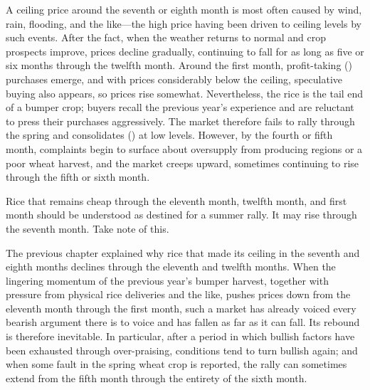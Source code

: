 \commentary
A ceiling price around the seventh or eighth month is most often
caused by wind, rain, flooding, and the like---the high price
having been driven to ceiling levels by such events. After the
fact, when the weather returns to normal and crop prospects improve,
prices decline gradually, continuing to fall for as long as five or
six months through the twelfth month. Around the first month,
profit-taking () purchases emerge, and with prices
considerably below the ceiling, speculative buying also appears, so
prices rise somewhat. Nevertheless, the rice is the tail end of a
bumper crop; buyers recall the previous year's experience and are
reluctant to press their purchases aggressively. The market
therefore fails to rally through the spring and consolidates
() at low levels. However, by the fourth or fifth
month, complaints begin to surface about oversupply from producing
regions or a poor wheat harvest, and the market creeps upward,
sometimes continuing to rise through the fifth or sixth month.


\begin{sokyubox}
{\small\itshape\color{sokyubar} }

\medskip
Rice that remains cheap through the eleventh month, twelfth month,
and first month should be understood as destined for a summer rally.
It may rise through the seventh month. Take note of this.
\end{sokyubox}

\commentary
The previous chapter explained why rice that made its ceiling in
the seventh and eighth months declines through the eleventh and
twelfth months. When the lingering momentum of the previous year's
bumper harvest, together with pressure from physical rice
deliveries and the like, pushes prices down from the eleventh month
through the first month, such a market has already voiced every
bearish argument there is to voice and has fallen as far as it can
fall. Its rebound is therefore inevitable. In particular, after a
period in which bullish factors have been exhausted through
over-praising, conditions tend to turn bullish again; and when some
fault in the spring wheat crop is reported, the rally can
sometimes extend from the fifth month through the entirety of the
sixth month.

